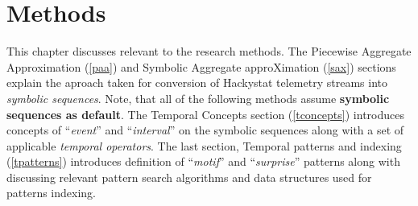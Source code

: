 \chapter{Methods}
This chapter discusses relevant to the research methods. The Piecewise Aggregate Approximation (\ref{paa}) and Symbolic Aggregate approXimation (\ref{sax}) sections explain the aproach taken for conversion of Hackystat telemetry streams into \textit{symbolic sequences}. Note, that all of the following methods assume \textbf{symbolic sequences as default}.
	The Temporal Concepts section (\ref{tconcepts}) introduces concepts of ``\textit{event}'' and ``\textit{interval}'' on the symbolic sequences along with a set of applicable \textit{temporal operators}. 
	The last section, Temporal patterns  and indexing (\ref{tpatterns}) introduces definition of ``\textit{motif}'' and ``\textit{surprise}'' patterns along with discussing relevant pattern search algorithms and data structures used for patterns indexing.

